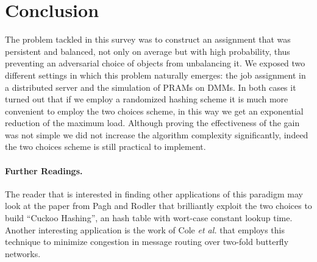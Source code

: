 \section{Conclusion}

The problem tackled in this survey was to construct an assignment that was
persistent and balanced, not only
on average but with high probability, thus preventing an adversarial choice of
objects from unbalancing it.
We exposed two different settings in which
this problem naturally emerges: the job assignment in a distributed server and
the simulation of PRAMs on DMMs. In both cases it turned out that if we
employ a randomized hashing scheme it is much more convenient to employ
the two choices scheme, in this way we get an exponential reduction of the
maximum load. Although proving the effectiveness of the gain was not simple
we did not increase the algorithm complexity significantly, indeed the two choices scheme is still practical to implement.

\paragraph{Further Readings.} The reader that is interested in finding
other applications of this paradigm may look at the paper from
Pagh and Rodler \cite{Pagh} that brilliantly exploit the two
choices to build ``Cuckoo Hashing'', an hash table with wort-case constant
lookup time. Another
interesting application is the work of Cole {\em et al.} \cite{Cole} that employs
this technique to minimize congestion in message routing over two-fold butterfly
networks.


